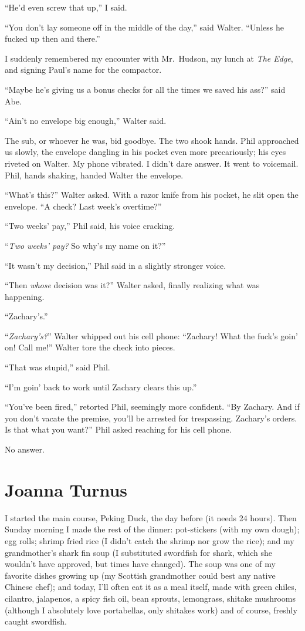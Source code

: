 ``He'd even screw that up,'' I said.

``You don't lay someone off in the middle of the day,'' said Walter.
``Unless he fucked up then and there.''

I suddenly remembered my encounter with Mr.~Hudson, my lunch at
\emph{The Edge}, and signing Paul's name for the compactor.

``Maybe he's giving us a bonus checks for all the times we saved his
ass?'' said Abe.

``Ain't no envelope big enough,'' Walter said.

The sub, or whoever he was, bid goodbye. The two shook hands. Phil
approached us slowly, the envelope dangling in his pocket even more
precariously; his eyes riveted on Walter. My phone vibrated. I didn't
dare answer. It went to voicemail. Phil, hands shaking, handed Walter
the envelope.

``What's this?'' Walter asked. With a razor knife from his pocket, he
slit open the envelope. ``A check? Last week's overtime?''

``Two weeks' pay,'' Phil said, his voice cracking.

``\emph{Two weeks' pay?} So why's my name on it?''

``It wasn't my decision,'' Phil said in a slightly stronger voice.

``Then \emph{whose} decision was it?'' Walter asked, finally realizing
what was happening.

``Zachary's.''

``\emph{Zachary's?}'' Walter whipped out his cell phone: ``Zachary! What
the fuck's goin' on! Call me!'' Walter tore the check into pieces.

``That was stupid,'' said Phil.

``I'm goin' back to work until Zachary clears this up.''

``You've been fired,'' retorted Phil, seemingly more confident. ``By
Zachary. And if you don't vacate the premise, you'll be arrested for
trespassing. Zachary's orders. Is that what you want?'' Phil asked
reaching for his cell phone.

No answer.

\chapter{Joanna Turnus}

\titlemark

I started the main course, Peking Duck, the day before (it needs 24
hours). Then Sunday morning I made the rest of the dinner: pot-stickers
(with my own dough); egg rolls; shrimp fried rice (I didn't catch the
shrimp nor grow the rice); and my grandmother's shark fin soup (I
substituted swordfish for shark, which she wouldn't have approved, but
times have changed). The soup was one of my favorite dishes growing up
(my Scottish grandmother could best any native Chinese chef); and today,
I'll often eat it as a meal itself, made with green chiles, cilantro,
jalapenos, a spicy fish oil, bean sprouts, lemongrass, shitake mushrooms
(although I absolutely love portabellas, only shitakes work) and of
course, freshly caught swordfish.


